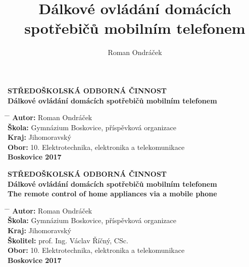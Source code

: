 \documentclass[12pt,a4paper,oneside]{article}
\author{Roman Ondráček}
\title{Dálkové ovládání domácích spotřebičů mobilním telefonem}
\begin{document}
\renewcommand{\baselinestretch}{1.5}
\pagestyle{empty}
\begin{center}
\large \textbf{STŘEDOŠKOLSKÁ ODBORNÁ ČINNOST} \\

\vspace{48mm}
\huge \textbf{Dálkové ovládání domácích spotřebičů mobilním telefonem} \\

\vspace{64mm}
\end{center}

\begin{tabbing}
\hspace{4mm} \= \hspace{24mm} \= \kill
\> \large \textbf{Autor:}  \> \large{Roman Ondráček}                                    \\[4mm]
\> \large \textbf{Škola:}  \> \large{Gymnázium Boskovice, příspěvková organizace}       \\[4mm]
\> \large \textbf{Kraj:}   \> \large{Jihomoravský}                                      \\[4mm]
\> \large \textbf{Obor:}   \> \large{10. Elektrotechnika, elektronika a telekomunikace} \\[24mm]
\> \large \textbf{Boskovice 2017}
\end{tabbing}

\newpage
\pagestyle{empty}
\begin{center}
\large \textbf{STŘEDOŠKOLSKÁ ODBORNÁ ČINNOST} \\

\vspace{48mm}
\huge \textbf{Dálkové ovládání domácích spotřebičů mobilním telefonem} \\
\vspace{24mm}
\huge \textbf{The remote control of home appliances via a mobile phone} \\

\vspace{24mm}
\end{center}

\begin{tabbing}
\hspace{4mm} \= \hspace{24mm} \= \kill
\> \large \textbf{Autor:}     \> \large{Roman Ondráček}                                    \\[4mm]
\> \large \textbf{Škola:}     \> \large{Gymnázium Boskovice, příspěvková organizace}       \\[4mm]
\> \large \textbf{Kraj:}      \> \large{Jihomoravský}                                      \\[4mm]
\> \large \textbf{Školitel:}  \> \large{prof. Ing. Václav Říčný, CSc.}                     \\[4mm]
\> \large \textbf{Obor:}      \> \large{10. Elektrotechnika, elektronika a telekomunikace} \\[16mm]
\> \large \textbf{Boskovice 2017}
\end{tabbing}
\end{document}
